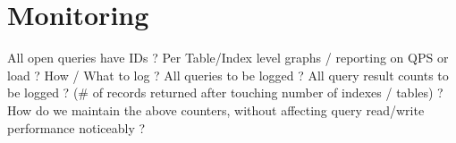 \section{Monitoring}

All open queries have IDs ?
Per Table/Index level graphs / reporting on QPS or load ?
How / What to log ?
All queries to be logged ?
All query result counts to be logged ? (# of records returned after touching number of indexes / tables) ?
How do we maintain the above counters, without affecting query read/write performance noticeably ?